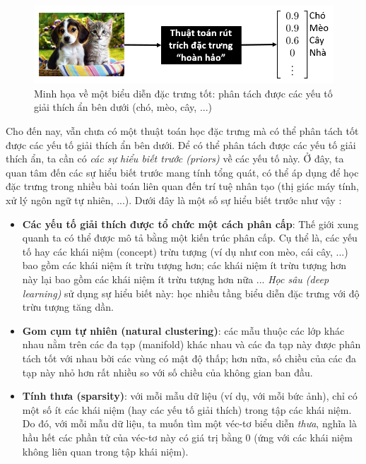 \begin{figure}
	\centering
	\includegraphics[width=\textwidth]{disentangle}
	\caption[Minh họa về một biểu diễn đặc trưng tốt]{Minh họa về một biểu diễn đặc trưng tốt: phân tách được các yếu tố giải thích ẩn bên dưới (chó, mèo, cây, ...)}
	\label{fig_disentangle}
\end{figure}

Cho đến nay, vẫn chưa có một thuật toán học đặc trưng mà có thể phân tách tốt được các yếu tố giải thích ẩn bên dưới. Để có thể phân tách được các yếu tố giải thích ẩn, ta cần có \emph{các sự hiểu biết trước (priors)} về các yếu tố này. Ở đây, ta quan tâm đến các sự hiểu biết trước mang tính tổng quát, có thể áp dụng để học đặc trưng trong nhiều bài toán liên quan đến trí tuệ nhân tạo (thị giác máy tính, xử lý ngôn ngữ tự nhiên, ...). Dưới đây là một số sự hiểu biết trước như vậy \cite{bengio2013representation}:
\begin{itemize}
	\item \textbf{Các yếu tố giải thích được tổ chức một cách phân cấp}: Thế giới xung quanh ta có thể được mô tả bằng một kiến trúc phân cấp. Cụ thể là, các yếu tố hay các khái niệm (concept) trừu tượng (ví dụ như con mèo, cái cây, ...) bao gồm các khái niệm ít trừu tượng hơn; các khái niệm ít trừu tượng hơn này lại bao gồm các khái niệm ít trừu tượng hơn nữa ... \emph{Học sâu (deep learning)} sử dụng sự hiểu biết này: học nhiều tầng biểu diễn đặc trưng với độ trừu tượng tăng dần.
	\item \textbf{Gom cụm tự nhiên (natural clustering)}: các mẫu thuộc các lớp khác nhau nằm trên các đa tạp (manifold) khác nhau và các đa tạp này được phân tách tốt với nhau bởi các vùng có mật độ thấp; hơn nữa, số chiều của các đa tạp này nhỏ hơn rất nhiều so với số chiều của không gian ban đầu.
	\item \textbf{Tính thưa (sparsity)}: với mỗi mẫu dữ liệu (ví dụ, với mỗi bức ảnh), chỉ có một số ít các khái niệm (hay các yếu tố giải thích) trong tập các khái niệm. Do đó, với mỗi mẫu dữ liệu, ta muốn tìm một véc-tơ biểu diễn \emph{thưa}, nghĩa là hầu hết các phần tử của véc-tơ này có giá trị bằng 0 (ứng với các khái niệm không liên quan trong tập khái niệm).
\end{itemize}

